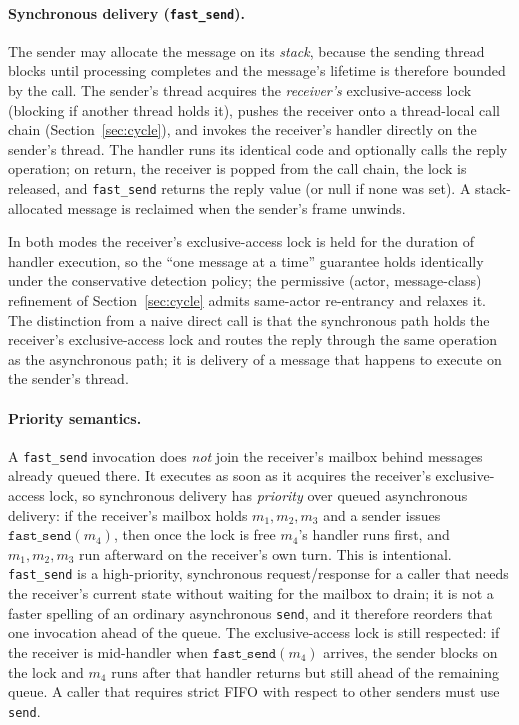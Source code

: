 \documentclass[11pt]{article}
\newcommand{\fs}{\texttt{fast\_send}}
\newcommand{\snd}{\texttt{send}}
\begin{document}
\paragraph{Synchronous delivery (\fs{}).} The sender may allocate the message on
its \emph{stack}, because the sending thread blocks until processing completes
and the message's lifetime is therefore bounded by the call. The sender's thread
acquires the \emph{receiver's} exclusive-access lock (blocking if another thread
holds it), pushes the receiver onto a thread-local call chain
(Section~\ref{sec:cycle}), and invokes the receiver's handler directly on the
sender's thread. The handler runs its identical code and optionally calls the
reply operation; on return, the receiver is popped from the call chain, the lock
is released, and \fs{} returns the reply value (or null if none was set). A
stack-allocated message is reclaimed when the sender's frame unwinds.

In both modes the receiver's exclusive-access lock is held for the duration of
handler execution, so the ``one message at a time'' guarantee holds identically
under the conservative detection policy; the permissive (actor, message-class)
refinement of Section~\ref{sec:cycle} admits same-actor re-entrancy and relaxes it.
The distinction from a naive direct call is that the synchronous path holds the
receiver's exclusive-access lock and routes the reply through the same operation
as the asynchronous path; it is delivery of a message that happens to execute on
the sender's thread.

\paragraph{Priority semantics.} A \fs{} invocation does \emph{not} join the
receiver's mailbox behind messages already queued there. It executes as soon as it
acquires the receiver's exclusive-access lock, so synchronous delivery has
\emph{priority} over queued asynchronous delivery: if the receiver's mailbox holds
$m_1,m_2,m_3$ and a sender issues $\fs(m_4)$, then once the lock is free $m_4$'s
handler runs first, and $m_1,m_2,m_3$ run afterward on the receiver's own turn.
This is intentional. \fs{} is a high-priority, synchronous request/response for a
caller that needs the receiver's current state without waiting for the mailbox to
drain; it is not a faster spelling of an ordinary asynchronous \snd{}, and it
therefore reorders that one invocation ahead of the queue. The exclusive-access
lock is still respected: if the receiver is mid-handler when $\fs(m_4)$ arrives,
the sender blocks on the lock and $m_4$ runs after that handler returns but still
ahead of the remaining queue. A caller that requires strict FIFO with respect to
other senders must use \snd{}.
\end{document}

